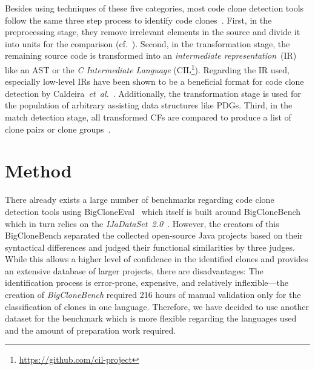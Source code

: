 \documentclass[10pt,journal,compsoc]{IEEEtran}
\def\todo#1{\textcolor{brown!80!yellow!70!black!90!red}{[\textsc{todo}: \textsf{#1}]}}
\newcommand*\urldate[2]{\url{#1}\;\textsuperscript{\color{gray}\DTMdate{#2}}}
\newcommand*\footurl[3][]{\footnote{#1\urldate{#2}{#3}}}
\begin{document}
Besides using techniques of these five categories, most code clone detection tools follow the same three step process to identify code clones~\cite{10.1145/3381307.3381310,ain2019systematic}.
First, in the preprocessing stage, they remove irrelevant elements in the source and divide it into units for the comparison (cf.~\cite{kamiya2002ccfinder,rattan2013software}).
Second, in the transformation stage, the remaining source code is transformed into an \textsl{intermediate representation}~(IR) like an AST or the \textit{C Intermediate Language} (CIL\footurl{https://github.com/cil-project}{2022-02-15}).
Regarding the IR used, especially low-level IRs have been shown to be a beneficial format for code clone detection by Caldeira~\textsl{et~al.}~\cite{caldeira2020improving}.
Additionally, the transformation stage is used for the population of arbitrary assisting data structures like PDGs.
Third, in the match detection stage, all transformed CFs are compared to produce a list of clone pairs or clone groups~\cite{roy2009comparison}.





\section{Method}\label{sec:Method}
There already exists a large number of benchmarks regarding code clone detection tools using BigCloneEval~\cite{svajlenko2014towards} which itself is built around BigCloneBench~\cite{svajlenko2021bigclonebench} which in turn relies on the \textsl{IJaDataSet~2.0}~\cite{ijadataset}.
However, the creators of this BigCloneBench separated the collected open-source Java projects based on their syntactical differences and judged their functional similarities by three judges.
While this allows a higher level of confidence in the identified clones and provides an extensive database of larger projects, there are disadvantages:
The identification process is error-prone, expensive, and relatively inflexible---the creation of \textsl{BigCloneBench} required 216 hours of manual validation only for the classification of clones in one language.
Therefore, we have decided to use another dataset for the benchmark which is more flexible regarding the languages used and the amount of preparation work required.
\end{document}
